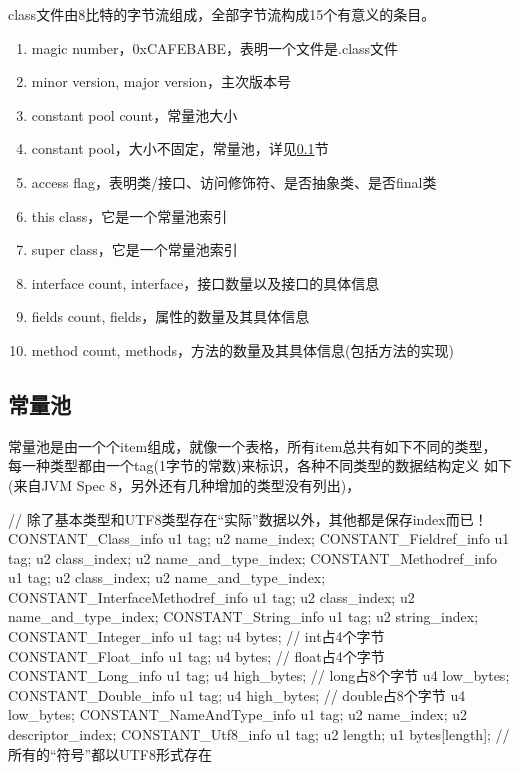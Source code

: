 class文件由8比特的字节流组成，全部字节流构成15个有意义的条目。
\begin{enumerate}
  \item magic number，0xCAFEBABE，表明一个文件是.class文件
  \item minor version, major version，主次版本号
  \item constant pool count，常量池大小
  \item constant pool，大小不固定，常量池，详见\ref{sec:constantpool}节
  \item access flag，表明类/接口、访问修饰符、是否抽象类、是否final类
  \item this class，它是一个常量池索引
  \item super class，它是一个常量池索引
  \item interface count, interface，接口数量以及接口的具体信息
  \item fields count, fields，属性的数量及其具体信息
  \item method count, methods，方法的数量及其具体信息(包括方法的实现)
\end{enumerate}

\subsection[常量池]{常量池}
\label{sec:constantpool}
常量池是由一个个item组成，就像一个表格，所有item总共有如下不同的类型，
每一种类型都由一个tag(1字节的常数)来标识，各种不同类型的数据结构定义
如下(来自JVM Spec 8，另外还有几种增加的类型没有列出)，

\begin{javacode}
// 除了基本类型和UTF8类型存在“实际”数据以外，其他都是保存index而已！
CONSTANT_Class_info {
  u1 tag;
  u2 name_index;
}
CONSTANT_Fieldref_info {
  u1 tag;
  u2 class_index;
  u2 name_and_type_index;
}
CONSTANT_Methodref_info {
  u1 tag;
  u2 class_index;
  u2 name_and_type_index;
}
CONSTANT_InterfaceMethodref_info {
  u1 tag;
  u2 class_index;
  u2 name_and_type_index;
}
CONSTANT_String_info {
  u1 tag;
  u2 string_index;
}
CONSTANT_Integer_info {
  u1 tag;
  u4 bytes; // int占4个字节
}
CONSTANT_Float_info {
  u1 tag;
  u4 bytes; // float占4个字节
}
CONSTANT_Long_info {
  u1 tag;
  u4 high_bytes; // long占8个字节
  u4 low_bytes;
}
CONSTANT_Double_info {
  u1 tag;
  u4 high_bytes; // double占8个字节
  u4 low_bytes;
}
CONSTANT_NameAndType_info {
  u1 tag;
  u2 name_index;
  u2 descriptor_index;
}
CONSTANT_Utf8_info {
  u1 tag;
  u2 length;
  u1 bytes[length]; // 所有的“符号”都以UTF8形式存在
}
\end{javacode}

